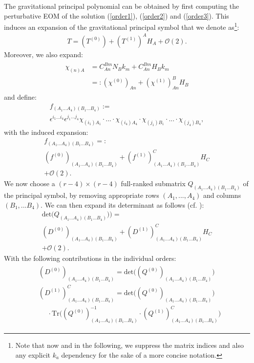 \documentclass[%
 reprint,
nofootinbib,
 amsmath,amssymb,
 aps,
 prd,
floatfix,
]{revtex4-2}
\begin{document}
The gravitational principal polynomial can be obtained by first computing the perturbative EOM of the solution (\ref{order1}), (\ref{order2}) and (\ref{order3}). This induces an expansion of the gravitational principal symbol that we denote as\footnote{Note that now and in the following, we suppress the matrix indices and also any explicit $k_a$ dependency for the sake of a more concise notation.}:
\begin{align}
    T = (T^{(0)}) + (T^{(1)})^AH_A + \mathcal{O}(2).
\end{align}
Moreover, we also expand:
\begin{align}
\begin{aligned}
\chi_{(n)A} &=  C^{Bm}_{An} N_B k_m + C^{Bm}_{An} H_B k_m\\
&=: (\chi^{(0)})_{An} + (\chi^{(1)})^B_{An}H_B
\end{aligned}
\end{align}
and define:
\begin{multline}\label{PreF}
f_{(A_1...A_4)(B_1...B_4)} := \\
\epsilon^{i_1...i_4} \epsilon^{j_1...j_4} \chi_{(i_1)A_1} \cdot ... \cdot \chi_{(i_4)A_4}\cdot \chi_{(j_1)B_1} \cdot ... \cdot \chi_{(j_4)B_4},
\end{multline}
with the induced expansion:
\begin{multline}
f_{(A_1...A_4)(B_1...B_4)} =: \\
(f^{(0)})_{(A_1...A_4)(B_1...B_4)} + (f^{(1)})^C_{(A_1...A_4)(B_1...B_4)}H_C\\
+ \mathcal{O}(2).
\end{multline}
We now choose a $(r-4) \times (r-4)$ full-ranked submatrix $Q_{(A_1...A_4)(B_1...B_4)}$ of the principal symbol, by removing appropriate rows $(A_1,...,A_4)$ and columns $(B_1,...B_4)$. We can then expand its determinant as follows (cf. \cite{IMM2012-03274}):
\begin{multline}
    \mathrm{det}\bigl(Q_{(A_1...A_4)(B_1...B_4)})\bigr) =\\
    (D^{(0)})_{(A_1...A_4)(B_1...B_4)} + (D^{(1)})^C_{(A_1...A_4)(B_1...B_4)}H_C\\
    + \mathcal{O}(2).
\end{multline}
With the following contributions in the individual orders:
\begin{align}\label{polyMatrices}
\begin{aligned}
  &(D^{(0)})_{(A_1...A_4)(B_1...B_4)} =  \mathrm{det}\bigl((Q^{(0)})_{(A_1...A_4)(B_1...B_4)}\bigr) \\
  &(D^{(1)})^C_{(A_1...A_4)(B_1...B_4)} = \mathrm{det}\bigl((Q^{(0)})_{(A_1...A_4)(B_1...B_4)}\bigr) \\
 & \ \ \ \ \ \ \cdot \mathrm{Tr} \bigl ( (Q^{(0)})^{-1}_{(A_1...A_4)(B_1...B_4)} 
   \cdot (Q^{(1)})_{(A_1...A_4)(B_1...B_4)}^C \bigr) 
\end{aligned}
\end{align} 
\end{document}
